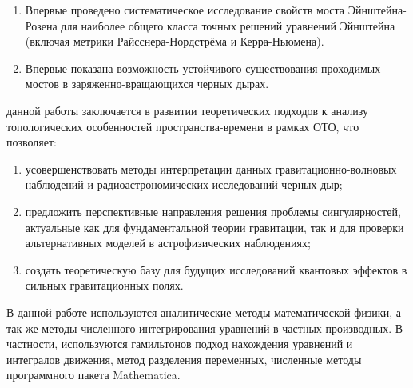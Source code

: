 {\novelty}
\begin{enumerate}[beginpenalty=10000] %
  \item Впервые проведено систематическое исследование свойств моста Эйнштейна-Розена для наиболее общего класса точных решений уравнений Эйнштейна (включая метрики Райсснера-Нордстрёма и Керра-Ньюмена).
  \item Впервые показана возможность устойчивого существования проходимых мостов в заряженно-вращающихся черных дырах.
\end{enumerate}

{\influence} данной работы заключается в развитии теоретических подходов к анализу топологических особенностей пространства-времени в рамках ОТО, что позволяет: 
\begin{enumerate}[beginpenalty=10000] %
   \item усовершенствовать методы интерпретации данных гравитационно-волновых наблюдений и радиоастрономических исследований черных дыр; 
   \item предложить перспективные направления решения проблемы сингулярностей, актуальные как для фундаментальной теории гравитации, так и для проверки альтернативных моделей в астрофизических наблюдениях;
   \item создать теоретическую базу для будущих исследований квантовых эффектов в сильных гравитационных полях.
\end{enumerate}

{\methods} В данной работе используются аналитические методы математической физики, а так же методы численного интегрирования уравнений в частных производных. В частности, используются гамильтонов подход нахождения уравнений и интегралов движения, метод разделения переменных, численные методы программного пакета Mathematica.

{}

